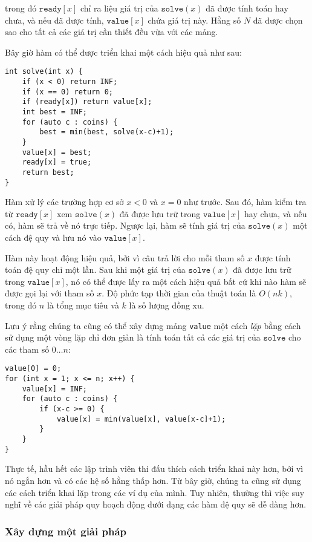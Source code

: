 trong đó $\texttt{ready}[x]$ chỉ ra
liệu giá trị của $\texttt{solve}(x)$ đã được tính toán hay chưa,
và nếu đã được tính, $\texttt{value}[x]$
chứa giá trị này.
Hằng số $N$ đã được chọn sao cho
tất cả các giá trị cần thiết đều vừa với các mảng.

Bây giờ hàm có thể được triển khai một cách hiệu quả
như sau:

\begin{lstlisting}
int solve(int x) {
    if (x < 0) return INF;
    if (x == 0) return 0;
    if (ready[x]) return value[x];
    int best = INF;
    for (auto c : coins) {
        best = min(best, solve(x-c)+1);
    }
    value[x] = best;
    ready[x] = true;
    return best;
}
\end{lstlisting}

Hàm xử lý các trường hợp cơ sở
$x<0$ và $x=0$ như trước.
Sau đó, hàm kiểm tra từ
$\texttt{ready}[x]$ xem
$\texttt{solve}(x)$ đã được lưu trữ
trong $\texttt{value}[x]$ hay chưa,
và nếu có, hàm sẽ trả về nó trực tiếp.
Ngược lại, hàm sẽ tính giá trị
của $\texttt{solve}(x)$
một cách đệ quy và lưu nó vào $\texttt{value}[x]$.

Hàm này hoạt động hiệu quả,
bởi vì câu trả lời cho mỗi tham số $x$
được tính toán đệ quy chỉ một lần.
Sau khi một giá trị của $\texttt{solve}(x)$ đã được lưu trữ trong $\texttt{value}[x]$,
nó có thể được lấy ra một cách hiệu quả bất cứ khi nào
hàm sẽ được gọi lại với tham số $x$.
Độ phức tạp thời gian của thuật toán là $O(nk)$,
trong đó $n$ là tổng mục tiêu và $k$ là số lượng đồng xu.

Lưu ý rằng chúng ta cũng có thể xây dựng mảng \texttt{value} một cách \emph{lặp}
bằng cách sử dụng một vòng lặp chỉ đơn giản là tính toán tất cả các giá trị
của $\texttt{solve}$ cho các tham số $0 \ldots n$:
\begin{lstlisting}
value[0] = 0;
for (int x = 1; x <= n; x++) {
    value[x] = INF;
    for (auto c : coins) {
        if (x-c >= 0) {
            value[x] = min(value[x], value[x-c]+1);
        }
    }
}
\end{lstlisting}

Thực tế, hầu hết các lập trình viên thi đấu thích cách
triển khai này hơn, bởi vì nó ngắn hơn và có
các hệ số hằng thấp hơn.
Từ bây giờ, chúng ta cũng sử dụng các cách triển khai lặp
trong các ví dụ của mình.
Tuy nhiên, thường thì việc suy nghĩ về
các giải pháp quy hoạch động
dưới dạng các hàm đệ quy sẽ dễ dàng hơn.


\subsubsection{Xây dựng một giải pháp}

